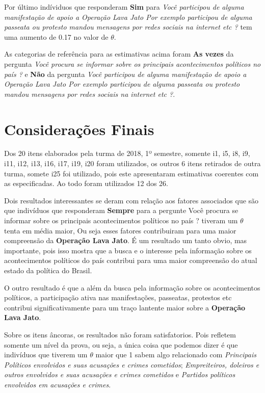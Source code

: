 \documentclass[]{article}
\begin{document}
Por último indíviduos que responderam \textbf{Sim} para \emph{Você
participou de alguma manifestação de apoio a Operação Lava Jato Por
exemplo participou de alguma passeata ou protesto mandou mensagens por
redes sociais na internet etc ?} tem uma aumento de 0.17 no valor de
\(\theta\).

As categorias de referência para as estimativas acima foram \textbf{As
vezes} da pergunta \emph{Você procura se informar sobre os principais
acontecimentos políticos no país ?} e \textbf{Não} da pergunta
\emph{Você participou de alguma manifestação de apoio a Operação Lava
Jato Por exemplo participou de alguma passeata ou protesto mandou
mensagens por redes sociais na internet etc ?}.

\section{Considerações Finais}\label{consideracoes-finais}

Dos 20 itens elaborados pela turma de 2018, 1º semestre, somente i1, i5,
i8, i9, i11, i12, i13, i16, i17, i19, i20 foram utilizados, os outros 6
itens retirados de outra turma, somete i25 foi utilizado, pois este
apresentaram estimativas coerentes com as especificadas. Ao todo foram
utilizados 12 dos 26.

Dois resultados interessantes se deram com relação aos fatores
associados que são que indivíduos que responderam \textbf{Sempre} para a
pergunte Você procura se informar sobre os principais acontecimentos
políticos no país ? tiveram um \(\theta\) tenta em média maior, Ou seja
esses fatores contribuiram para uma maior compreensão da
\textbf{Operação Lava Jato}. É um resultado um tanto obvio, mas
importante, pois isso mostra que a busca e o interesse pela informação
sobre os acontecimentos políticos do país contribui para uma maior
compreensão do atual estado da política do Brasil.

O outro resultado é que a além da busca pela informação sobre os
acontecimentos políticos, a participação ativa nas manifestações,
passeatas, protestos etc contribui significativamente para um traço
lantente maior sobre a \textbf{Operação Lava Jato}.

Sobre os itens âncoras, os resultados não foram satisfatorios. Pois
refletem somente um nível da prova, ou seja, a única coisa que podemos
dizer é que indivíduos que tiverem um \(\theta\) maior que 1 sabem algo
relacionado com \emph{Principais Políticos envolvidos e suas acusações e
crimes cometidos}; \emph{Empreiteiros, doleiros e outros envolvidos e
suas acusações e crimes cometidos} e \emph{Partidos políticos envolvidos
em acusações e crimes}.
\end{document}
